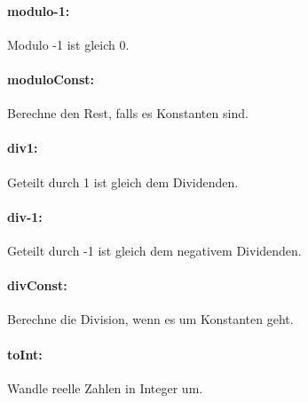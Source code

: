 \documentclass[a4paper]{article}
\begin{document}
\paragraph{modulo-1:} Modulo -1 ist gleich 0.
\begin{mathpar}
\end{mathpar}
\paragraph{moduloConst:} Berechne den Rest, falls es Konstanten sind.
\begin{mathpar}
\end{mathpar}
\paragraph{div1:} Geteilt durch 1 ist gleich dem Dividenden.
\begin{mathpar}
\end{mathpar}
\paragraph{div-1:} Geteilt durch -1 ist gleich dem negativem Dividenden.
\begin{mathpar}
\end{mathpar}
\paragraph{divConst:} Berechne die Division, wenn es um Konstanten geht.
\begin{mathpar}
\end{mathpar}
\paragraph{toInt:} Wandle reelle Zahlen in Integer um.
\begin{mathpar}
\end{mathpar}
\end{document}
